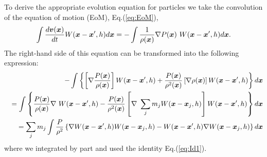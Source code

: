 \documentclass{cjour}
\newcommand{ \Vec   }[1]{ \mbox{\boldmath $ #1 $} }
\begin{document}
\begin{article}
To derive the appropriate evolution equation for particles
we take the convolution of the equation of motion (EoM), 
Eq.(\ref{eq:EoM}), 
\begin{equation}
       \int \frac{ d \Vec{v}(\Vec{x}) }{ dt } 
                                W(\Vec{x}-\Vec{x}',h) d\Vec{x} =
     - \int \frac{1}{\rho(\Vec{x})} \nabla P(\Vec{x}) ~
                                W(\Vec{x}-\Vec{x}',h) d\Vec{x}.
                                               \label{eq:EocEoM}
\end{equation}
The right-hand side of this equation can be transformed into 
the following expression: 
\begin{eqnarray}
 &&
     - \int \left\{ 
                      \left[ \nabla  \frac{P(\Vec{x}) }{\rho(\Vec{x})}
                      \right]
                             W(\Vec{x}-\Vec{x}',h) 
                    +        \frac{P(\Vec{x}) }{\rho^2(\Vec{x})} 
                      \left[ \nabla \rho(\Vec{x}) 
                      \right]
                             W(\Vec{x}-\Vec{x}',h) 
            \right\}          d\Vec{x}  
                                                        \nonumber \\
 &&  = 
       \int \left\{ 
                             \frac{P(\Vec{x}) }{\rho(\Vec{x})} 
                      \nabla~W(\Vec{x}-\Vec{x}',h) 
                    -        \frac{P(\Vec{x}) }{\rho^2(\Vec{x})} 
                      \left[ \nabla~\sum_{j} m_j 
                                    W(\Vec{x}-\Vec{x}_{j},h)
                      \right]
                             W(\Vec{x}-\Vec{x}',h) 
            \right\}          d\Vec{x}  
                                                        \nonumber \\
 &&  = \sum_{j} m_{j} 
       \int \frac{P}{\rho^2}
              \left\{ 
                      \nabla W(\Vec{x} -\Vec{x}' ,h)
                             W(\Vec{x} -\Vec{x}_j,h)
                    -        W(\Vec{x} -\Vec{x}' ,h)
                      \nabla W(\Vec{x} -\Vec{x}_j,h)
              \right\} 
                                                         d\Vec{x}
                                                        \nonumber \\
                                                \label{eq:EoM3}
\end{eqnarray}
where we integrated by part and 
used the identity Eq.(\ref{eq:Id1}). 
 

\end{article}
\end{document}
